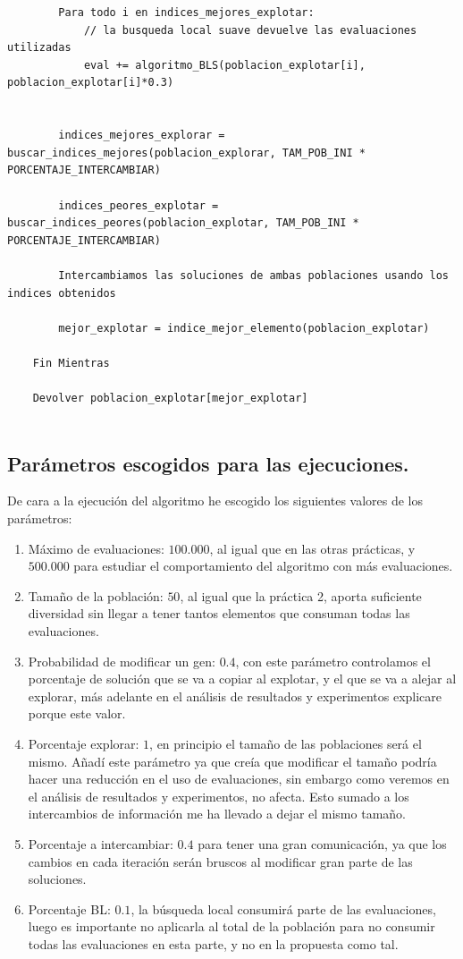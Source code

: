\documentclass[12pt, spanish]{article}
\begin{document}
\begin{lstlisting}
		Para todo i en indices_mejores_explotar:
			// la busqueda local suave devuelve las evaluaciones utilizadas			
			eval += algoritmo_BLS(poblacion_explotar[i], poblacion_explotar[i]*0.3)
			
			
		indices_mejores_explorar = buscar_indices_mejores(poblacion_explorar, TAM_POB_INI * PORCENTAJE_INTERCAMBIAR)
		
		indices_peores_explotar = buscar_indices_peores(poblacion_explotar, TAM_POB_INI * PORCENTAJE_INTERCAMBIAR)
		
		Intercambiamos las soluciones de ambas poblaciones usando los indices obtenidos
		
		mejor_explotar = indice_mejor_elemento(poblacion_explotar)

	Fin Mientras

	Devolver poblacion_explotar[mejor_explotar]
			
\end{lstlisting}




\subsection{Parámetros escogidos para las ejecuciones.}

De cara a la ejecución del algoritmo he escogido los siguientes valores de los parámetros:


\begin{enumerate}
	\item Máximo de evaluaciones: $100.000$, al igual que en las otras prácticas, y $500.000$ para estudiar el comportamiento del algoritmo con más evaluaciones.
	\item Tamaño de la población: $50$, al igual que la práctica 2, aporta suficiente diversidad sin llegar a tener tantos elementos que consuman todas las evaluaciones.
	\item Probabilidad de modificar un gen: $0.4$, con este parámetro controlamos el porcentaje de solución que se va a copiar al explotar, y el que se va a alejar al explorar, más adelante en el análisis de resultados y experimentos explicare porque este valor.
	\item Porcentaje explorar: $1$, en principio el tamaño de las poblaciones será el mismo. Añadí este parámetro ya que creía que modificar el tamaño podría hacer una reducción en el uso de evaluaciones, sin embargo como veremos en el análisis de resultados y experimentos, no afecta. Esto sumado a los intercambios de información me ha llevado a dejar el mismo tamaño.
	\item Porcentaje a intercambiar: $0.4$ para tener una gran comunicación, ya que los cambios en cada iteración serán bruscos al modificar gran parte de las soluciones.
	\item Porcentaje BL: $0.1$, la búsqueda local consumirá parte de las evaluaciones, luego es importante no aplicarla al total de la población para no consumir todas las evaluaciones en esta parte, y no en la propuesta como tal.
\end{enumerate}
\end{document}

